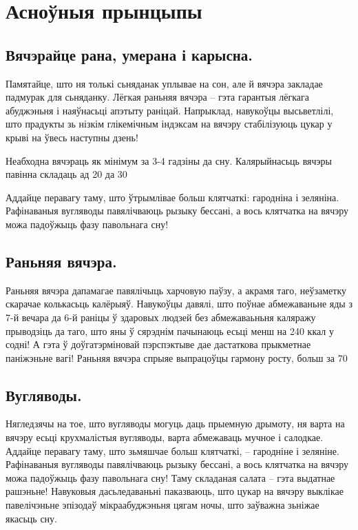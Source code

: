 \section{Асноўныя прынцыпы}

\subsection{Вячэрайце рана, умерана і карысна.}
Памятайце, што ня толькі сьняданак уплывае на сон, але й вячэра закладае падмурак для сьняданку. Лёгкая раньняя вячэра – гэта гарантыя лёгкага абуджэньня і наяўнасьці апэтыту раніцай. Напрыклад, навукоўцы высьветлілі, што прадукты зь нізкім глікемічным індэксам на вячэру стабілізуюць цукар у крыві на ўвесь наступны дзень!

Неабходна вячэраць як мінімум за 3-4 гадзіны да сну. Калярыйнасьць вячэры павінна складаць ад 20 да 30%

Аддайце перавагу таму, што ўтрымлівае больш клятчаткі: гародніна і зеляніна. Рафінаваныя вугляводы павялічваюць рызыку бессані, а вось клятчатка на вячэру можа падоўжыць фазу павольнага сну!

\subsection{Раньняя вячэра.}
Раньняя вячэра дапамагае павялічыць харчовую паўзу, а акрамя таго, неўзаметку скарачае колькасьць калёрыяў. Навукоўцы давялі, што поўнае абмежаваньне яды з 7-й вечара да 6-й раніцы ў здаровых людзей без абмежаваьньня каляражу прыводзіць да таго, што яны ў сярэднім пачынаюць есьці менш на 240 ккал у содні! А гэта ў доўгатэрміновай пэрспэктыве дае дастаткова прыкметнае паніжэньне вагі! Раньняя вячэра спрыяе выпрацоўцы гармону росту, больш за 70%

\subsection{Вугляводы.}
Нягледзячы на тое, што вугляводы могуць даць прыемную дрымоту, ня варта на вячэру есьці крухмалістыя вугляводы, варта абмежаваць мучное і салодкае. Аддайце перавагу таму, што зьмяшчае больш клятчаткі, – гародніне і зеляніне. Рафінаваныя вугляводы павялічваюць рызыку бессані, а вось клятчатка на вячэру можа падоўжыць фазу павольнага сну! Таму складаная салата – гэта выдатнае рашэньне! Навуковыя дасьледаваньні паказваюць, што цукар на вячэру выклікае павелічэньне эпізодаў мікраабуджэньня цягам ночы, што заўважна зьніжае якасьць сну.

